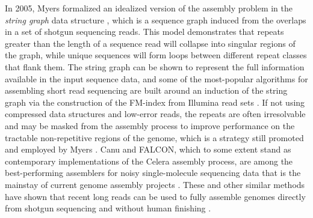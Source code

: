 In 2005, Myers formalized an idealized version of the assembly problem in the \emph{string graph} data structure \cite{myers2005}, which is a sequence graph induced from the overlaps in a set of shotgun sequencing reads.
This model demonstrates that repeats greater than the length of a sequence read will collapse into singular regions of the graph, while unique sequences will form loops between different repeat classes that flank them.
The string graph can be shown to represent the full information available in the input sequence data, and some of the most-popular algorithms for assembling short read sequencing are built around an induction of the string graph via the construction of the FM-index \cite{ferragina2001experimental} from Illumina read sets \cite{simpson2010,simpson2012efficient,li2015fermikit}.
If not using compressed data structures and low-error reads, the repeats are often irresolvable and may be masked from the assembly process to improve performance on the tractable non-repetitive regions of the genome, which is a strategy still promoted and employed by Myers \cite{myers2014efficient}.
Canu and FALCON, which to some extent stand as contemporary implementations of the Celera assembly process, are among the best-performing assemblers for noisy single-molecule sequencing data that is the mainstay of current genome assembly projects \cite{chin2016phased,koren2017canu}.
These and other similar methods have shown that recent long reads can be used to fully assemble genomes directly from shotgun sequencing and without human finishing \cite{loman2015complete,jain2018nanopore}.

